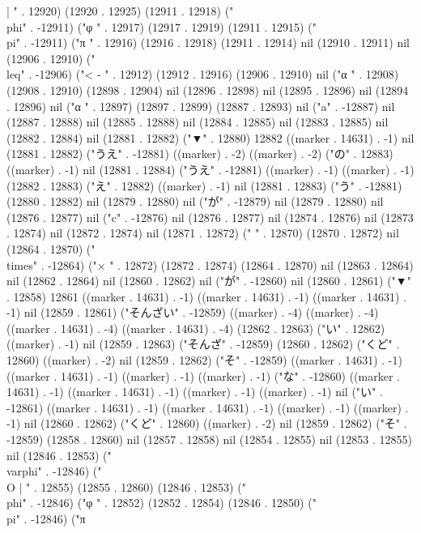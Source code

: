 |
" . 12920) (12920 . 12925) (12911 . 12918) ("\\phi" . -12911) ("φ
" . 12917) (12917 . 12919) (12911 . 12915) ("\\pi" . -12911) ("π
" . 12916) (12916 . 12918) (12911 . 12914) nil (12910 . 12911) nil (12906 . 12910) ("\\leq" . -12906) ("<
-
" . 12912) (12912 . 12916) (12906 . 12910) nil ("α
" . 12908) (12908 . 12910) (12898 . 12904) nil (12896 . 12898) nil (12895 . 12896) nil (12894 . 12896) nil ("α
" . 12897) (12897 . 12899) (12887 . 12893) nil ("a" . -12887) nil (12887 . 12888) nil (12885 . 12888) nil (12884 . 12885) nil (12883 . 12885) nil (12882 . 12884) nil (12881 . 12882) ("▼" . 12880) 12882 ((marker . 14631) . -1) nil (12881 . 12882) ("うえ" . -12881) ((marker) . -2) ((marker) . -2) ("の" . 12883) ((marker) . -1) nil (12881 . 12884) ("うえ" . -12881) ((marker) . -1) ((marker) . -1) (12882 . 12883) ("え" . 12882) ((marker) . -1) nil (12881 . 12883) ("う" . -12881) (12880 . 12882) nil (12879 . 12880) nil ("が" . -12879) nil (12879 . 12880) nil (12876 . 12877) nil ("c" . -12876) nil (12876 . 12877) nil (12874 . 12876) nil (12873 . 12874) nil (12872 . 12874) nil (12871 . 12872) (" " . 12870) (12870 . 12872) nil (12864 . 12870) ("\\times" . -12864) ("×
" . 12872) (12872 . 12874) (12864 . 12870) nil (12863 . 12864) nil (12862 . 12864) nil (12860 . 12862) nil ("が" . -12860) nil (12860 . 12861) ("▼" . 12858) 12861 ((marker . 14631) . -1) ((marker . 14631) . -1) ((marker . 14631) . -1) nil (12859 . 12861) ("そんざい" . -12859) ((marker) . -4) ((marker) . -4) ((marker . 14631) . -4) ((marker . 14631) . -4) (12862 . 12863) ("い" . 12862) ((marker) . -1) nil (12859 . 12863) ("そんざ" . -12859) (12860 . 12862) ("くど" . 12860) ((marker) . -2) nil (12859 . 12862) ("そ" . -12859) ((marker . 14631) . -1) ((marker . 14631) . -1) ((marker) . -1) ((marker) . -1) ("な" . -12860) ((marker . 14631) . -1) ((marker . 14631) . -1) ((marker) . -1) ((marker) . -1) nil ("い" . -12861) ((marker . 14631) . -1) ((marker . 14631) . -1) ((marker) . -1) ((marker) . -1) nil (12860 . 12862) ("くど" . 12860) ((marker) . -2) nil (12859 . 12862) ("そ" . -12859) (12858 . 12860) nil (12857 . 12858) nil (12854 . 12855) nil (12853 . 12855) nil (12846 . 12853) ("\\varphi" . -12846) ("\\O
|
" . 12855) (12855 . 12860) (12846 . 12853) ("\\phi" . -12846) ("φ
" . 12852) (12852 . 12854) (12846 . 12850) ("\\pi" . -12846) ("π
